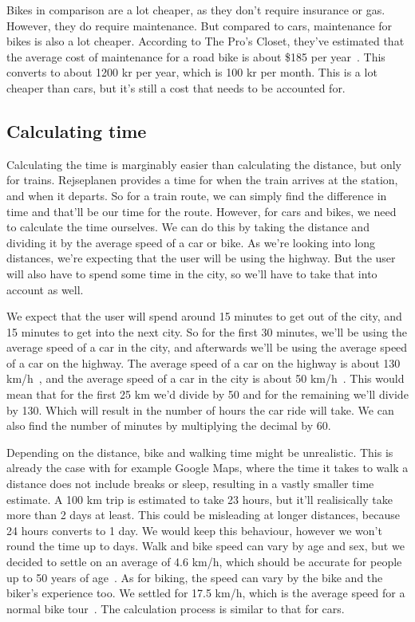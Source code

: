 Bikes in comparison are a lot cheaper, as they don't require insurance or gas.
However, they do require maintenance.
But compared to cars, maintenance for bikes is also a lot cheaper.
According to The Pro's Closet, they've estimated that the average cost of maintenance for a road bike is about \$185 per
year~\cite{price_bike}.
This converts to about 1200 kr per year, which is 100 kr per month.
This is a lot cheaper than cars, but it's still a cost that needs to be accounted for.

\subsection{Calculating time}\label{subsec:calculating-time}

Calculating the time is marginably easier than calculating the distance, but only for trains.
Rejseplanen provides a time for when the train arrives at the station, and when it departs.
So for a train route, we can simply find the difference in time and that'll be our time for the route.
However, for cars and bikes, we need to calculate the time ourselves.
We can do this by taking the distance and dividing it by the average speed of a car or bike.
As we're looking into long distances, we're expecting that the user will be using the highway.
But the user will also have to spend some time in the city, so we'll have to take that into account as well.

We expect that the user will spend around 15 minutes to get out of the city, and 15 minutes to get into the next city.
So for the first 30 minutes, we'll be using the average speed of a car in the city, and afterwards we'll be using the
average speed of a car on the highway.
The average speed of a car on the highway is about 130 km/h~\cite{time_highway}, and the average speed of a car in
the city is about 50 km/h~\cite{time_city}.
This would mean that for the first 25 km we'd divide by 50 and for the remaining we'll divide by 130.
Which will result in the number of hours the car ride will take.
We can also find the number of minutes by multiplying the decimal by 60.

Depending on the distance, bike and walking time might be unrealistic.
This is already the case with for example Google Maps, where the time it takes to walk a distance does not include
breaks or sleep, resulting in a vastly smaller time estimate.
A 100 km trip is estimated to take 23 hours, but it'll realisically take more than 2 days at least.
This could be misleading at longer distances, because 24 hours converts to 1 day.
We would keep this behaviour, however we won't round the time up to days.
Walk and bike speed can vary by age and sex, but we decided to settle on an average of 4.6 km/h, which should be
accurate for people up to 50 years of age~\cite{time_walk}.
As for biking, the speed can vary by the bike and the biker's experience too.
We settled for 17.5 km/h, which is the average speed for a normal bike tour~\cite{time_bike}.
The calculation process is similar to that for cars.

